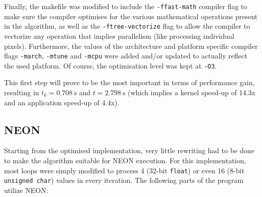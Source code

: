 \documentclass[final]{article}
\begin{document}
Finally, the makefile was modified to include the \texttt{-ffast-math} compiler flag to make sure the compiler optimises for the various mathematical operations present in the algorithm, as well as the \texttt{-ftree-vectorize} flag to allow the compiler to vectorize any operation that implies parallelism (like processing individual pixels).
Furthermore, the values of the architecture and platform specific compiler flags \texttt{-march}, \texttt{-mtune} and \texttt{-mcpu} were added and/or updated to actually reflect the used platform.
Of course, the optimisation level was kept at \texttt{-O3}.

This first step will prove to be the most important in terms of performance gain, resulting in $t_k = \SI{0.708}{\second}$ and $t = \SI{2.798}{\second}$ (which implies a kernel speed-up of 14.3x and an application speed-up of 4.4x).


\subsection{NEON}
Starting from the optimised implementation, very little rewriting had to be done to make the algorithm suitable for NEON execution.
For this implementation, most loops were simply modified to process 4 (32-bit \texttt{float}) or even 16 (8-bit \texttt{unsigned char}) values in every iteration.
The following parts of the program utilize NEON:
\end{document}

